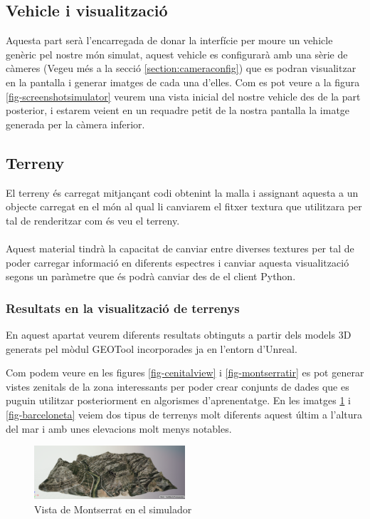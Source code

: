 \documentclass[10pt,a4paper,twocolumn,twoside]{article}
\begin{document}
\subsection{Vehicle i visualització}
Aquesta part serà l'encarregada de donar la interfície per moure un vehicle genèric pel nostre món simulat, aquest vehicle es configurarà amb una sèrie de càmeres (Vegeu més a la secció \ref{section:cameraconfig}) que es podran visualitzar en la pantalla i generar imatges de cada una d'elles. Com es pot veure a la figura \ref{fig-screenshotsimulator} veurem una vista inicial del nostre vehicle des de la part posterior, i estarem veient en un requadre petit de la nostra pantalla la imatge generada per la càmera inferior.

\subsection{Terreny}
El terreny és carregat mitjançant codi obtenint la malla i assignant aquesta a un objecte carregat en el món al qual li canviarem el fitxer textura que utilitzara per tal de renderitzar com és veu el terreny. 
\\
\\
Aquest material tindrà la capacitat de canviar entre diverses textures per tal de poder carregar informació en diferents espectres i canviar aquesta visualització segons un paràmetre que és podrà canviar des de el client Python.

\subsubsection{Resultats en la visualització de terrenys}
En aquest apartat veurem diferents resultats obtinguts a partir dels models 3D generats pel mòdul GEOTool incorporades ja en l'entorn d'Unreal.

Com podem veure en les figures \ref{fig-cenitalview} i \ref{fig-montserratir} es pot generar vistes zenitals de la zona interessants per poder crear conjunts de dades que es puguin utilitzar posteriorment en algorismes d'aprenentatge. En les imatges \ref{fig-montserrat} i \ref{fig-barceloneta} veiem dos tipus de terrenys molt diferents aquest últim a l'altura del mar i amb unes elevacions molt menys notables.

\begin{figure}[!h]
\centering
  	\includegraphics[width=0.5\textwidth]{montserrat}
	\caption{Vista de Montserrat en el simulador}
	\label{fig-montserrat}
\end{figure}
\end{document}
